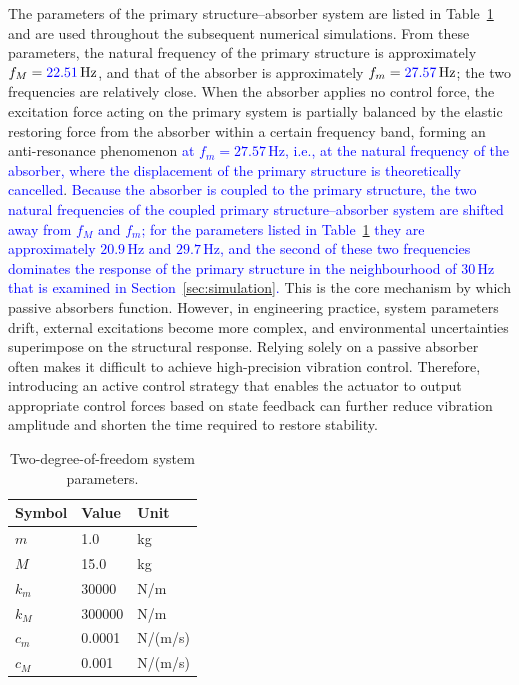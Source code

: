 \documentclass[review]{elsarticle}
\begin{document}
The parameters of the primary structure--absorber system are listed in Table~\ref{tab:system_params} and are used throughout the subsequent numerical simulations.
From these parameters, the natural frequency of the primary structure is approximately $f_{M}=\textcolor{blue}{22.51}\,\text{Hz}$, and that of the absorber is approximately $f_{m}=\textcolor{blue}{27.57}\,\text{Hz}$; the two frequencies are relatively close.
When the absorber applies no control force, the excitation force acting on the primary system is partially balanced by the elastic restoring force from the absorber within a certain frequency band, forming an anti-resonance phenomenon \textcolor{blue}{at $f_{m}=27.57\,\text{Hz}$, i.e., at the natural frequency of the absorber, where the displacement of the primary structure is theoretically cancelled}.
\textcolor{blue}{Because the absorber is coupled to the primary structure, the two natural frequencies of the coupled primary structure--absorber system are shifted away from $f_{M}$ and $f_{m}$; for the parameters listed in Table~\ref{tab:system_params} they are approximately $20.9\,\text{Hz}$ and $29.7\,\text{Hz}$, and the second of these two frequencies dominates the response of the primary structure in the neighbourhood of $30\,\text{Hz}$ that is examined in Section~\ref{sec:simulation}.}
This is the core mechanism by which passive absorbers function.
However, in engineering practice, system parameters drift, external excitations become more complex, and environmental uncertainties superimpose on the structural response.
Relying solely on a passive absorber often makes it difficult to achieve high-precision vibration control.
Therefore, introducing an active control strategy that enables the actuator to output appropriate control forces based on state feedback can further reduce vibration amplitude and shorten the time required to restore stability.

\begin{table}[htbp]
\centering
\caption{Two-degree-of-freedom system parameters.}
\label{tab:system_params}
\begin{tabular}{lll} 
\toprule   
Symbol & Value & Unit \\  
\midrule   
$m$    & 1.0   & kg   \\
$M$    & 15.0  & kg   \\
$k_m$  & 30000 & N/m  \\
$k_M$  & 300000& N/m  \\
$c_m$  & 0.0001& N/(m/s) \\
$c_M$  & 0.001 & N/(m/s) \\
\bottomrule  
\end{tabular}
\end{table}
\end{document}
